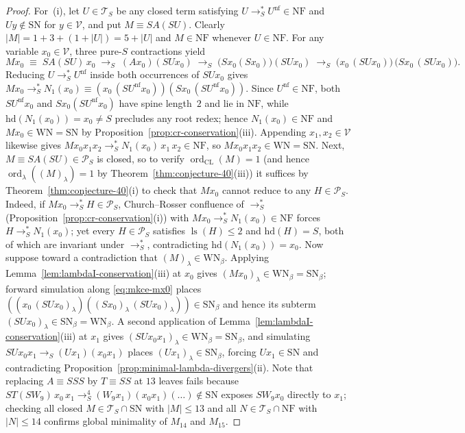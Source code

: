 \documentclass[11pt,reqno]{amsart}
\numberwithin{equation}{section}
\theoremstyle{plain}
\theoremstyle{definition}
\theoremstyle{remark}
\DeclareMathOperator{\ls}{ls}
\DeclareMathOperator{\ord}{ord}
\newcommand{\TS}{\mathcal{T}_S}
\newcommand{\NF}{\mathrm{NF}}
\newcommand{\SN}{\mathrm{SN}}
\newcommand{\WN}{\mathrm{WN}}
\newcommand{\redS}{\to_S}
\newcommand{\redSs}{\to_S^*}
\begin{document}
\begin{proof}
For~(i), let $U \in \TS$ be any closed term satisfying $U \redSs U^{\mathrm{nf}} \in \NF$ and $U y \notin \SN$ for $y \in \mathcal{V}$, and put $M \equiv S A (S U)$. Clearly $|M| = 1 + 3 + (1 + |U|) = 5 + |U|$ and $M \in \NF$ whenever $U \in \NF$. For any variable $x_0 \in \mathcal{V}$, three pure-$S$ contractions yield
\begin{equation}\label{eq:mkce-mx0}
  M x_0 \;\equiv\; S A (S U)\,x_0 \;\redS\; (A x_0)(S U x_0) \;\redS\; \bigl(S x_0 (S x_0)\bigr)(S U x_0) \;\redS\; \bigl(x_0\,(S U x_0)\bigr)\,\bigl(S x_0\,(S U x_0)\bigr).
\end{equation}
Reducing $U \redSs U^{\mathrm{nf}}$ inside both occurrences of $S U x_0$ gives $M x_0 \redSs N_1(x_0) \equiv (x_0\,(S U^{\mathrm{nf}} x_0))(S x_0\,(S U^{\mathrm{nf}} x_0))$. Since $U^{\mathrm{nf}} \in \NF$, both $S U^{\mathrm{nf}} x_0$ and $S x_0 (S U^{\mathrm{nf}} x_0)$ have spine length~$2$ and lie in $\NF$, while $\mathrm{hd}(N_1(x_0)) = x_0 \ne S$ precludes any root redex; hence $N_1(x_0) \in \NF$ and $M x_0 \in \WN = \SN$ by Proposition~\ref{prop:cr-conservation}(iii). Appending $x_1, x_2 \in \mathcal{V}$ likewise gives $M x_0 x_1 x_2 \redSs N_1(x_0)\,x_1\,x_2 \in \NF$, so $M x_0 x_1 x_2 \in \WN = \SN$. Next, $M \equiv S A (S U) \in \mathcal{P}_S$ is closed, so to verify $\ord_{\mathrm{CL}}(M) = 1$ (and hence $\ord_\lambda((M)_\lambda) = 1$ by Theorem~\ref{thm:conjecture-40}(iii)) it suffices by Theorem~\ref{thm:conjecture-40}(i) to check that $M x_0$ cannot reduce to any $H \in \mathcal{P}_S$. Indeed, if $M x_0 \redSs H \in \mathcal{P}_S$, Church--Rosser confluence of $\redSs$ (Proposition~\ref{prop:cr-conservation}(i)) with $M x_0 \redSs N_1(x_0) \in \NF$ forces $H \redSs N_1(x_0)$; yet every $H \in \mathcal{P}_S$ satisfies $\ls(H) \le 2$ and $\mathrm{hd}(H) = S$, both of which are invariant under $\redSs$, contradicting $\mathrm{hd}(N_1(x_0)) = x_0$. Now suppose toward a contradiction that $(M)_\lambda \in \WN_\beta$. Applying Lemma~\ref{lem:lambdaI-conservation}(iii) at $x_0$ gives $(M x_0)_\lambda \in \WN_\beta = \SN_\beta$; forward simulation along \eqref{eq:mkce-mx0} places $((x_0\,(S U x_0)_\lambda)((S x_0)_\lambda\,(S U x_0)_\lambda)) \in \SN_\beta$ and hence its subterm $(S U x_0)_\lambda \in \SN_\beta = \WN_\beta$. A second application of Lemma~\ref{lem:lambdaI-conservation}(iii) at $x_1$ gives $(S U x_0 x_1)_\lambda \in \WN_\beta = \SN_\beta$, and simulating $S U x_0 x_1 \redS (U x_1)(x_0 x_1)$ places $(U x_1)_\lambda \in \SN_\beta$, forcing $U x_1 \in \SN$ and contradicting Proposition~\ref{prop:minimal-lambda-divergers}(ii). Note that replacing $A \equiv S S S$ by $T \equiv S S$ at $13$ leaves fails because $S T (S W_9)\,x_0\,x_1 \redS^4 (W_9 x_1)(x_0 x_1)(\dots) \notin \SN$ exposes $S W_9 x_0$ directly to $x_1$; checking all closed $M \in \TS \cap \SN$ with $|M| \le 13$ and all $N \in \TS \cap \NF$ with $|N| \le 14$ confirms global minimality of $M_{14}$ and $M_{15}$.


\end{proof}
\end{document}
